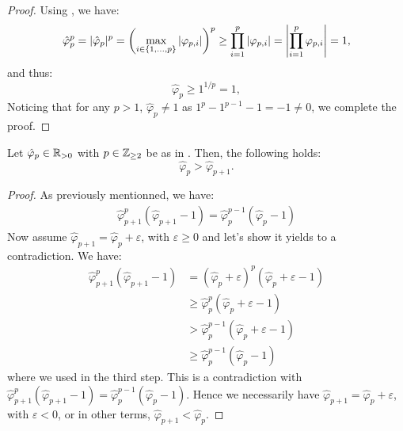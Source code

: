 \documentclass{article}
\begin{document}
    \begin{proof}
      Using , we have:
      \begin{equation} 
        \hat{\varphi}_p^p = |\hat{\varphi}_p|^p = \left(\max_{i \in \{1, \dots, p\}} |\varphi_{p, i}|\right)^p \geq \prod_{i=1}^p |\varphi_{p, i}| 
        = \left|\prod_{i=1}^p \varphi_{p, i}\right| = 1,
      \end{equation}
      and thus:
      \begin{equation} 
        \hat{\varphi}_p \geq 1^{1/p} = 1,
      \end{equation}
      Noticing that for any $p > 1$, $\hat{\varphi}_p \neq 1$ as $1^p - 1^{p-1} -1 = -1 \neq 0$, we complete the proof.
    \end{proof}

    \begin{theorem} \label{thm:A-11}
      Let $\hat{\varphi}_{p} \in \mathbb{R}_{>0}$ with $p \in \mathbb{Z}_{\geq 2}$ be as in . Then, the following holds:
      \begin{equation} 
        \hat{\varphi}_p > \hat{\varphi}_{p+1}.
      \end{equation}
    \end{theorem}
    
    \begin{proof}
      As previously mentionned, we have:
      \begin{align}
        \hat{\varphi}_{p+1}^{p}(\hat{\varphi}_{p+1} - 1) = \hat{\varphi}_{p}^{p-1}(\hat{\varphi}_{p} - 1) 
      \end{align}
      Now assume $\hat{\varphi}_{p+1} = \hat{\varphi}_{p} + \varepsilon$, with $\varepsilon \geq 0$ and let's show it yields to 
      a contradiction. We have:
      \begin{align} 
        \hat{\varphi}_{p+1}^{p}(\hat{\varphi}_{p+1} - 1) 
        & = (\hat{\varphi}_{p} + \varepsilon)^{p}(\hat{\varphi}_{p} + \varepsilon - 1) \\
        & \geq \hat{\varphi}_{p}^{p}(\hat{\varphi}_{p} + \varepsilon - 1) \\
        & > \hat{\varphi}_{p}^{p-1}(\hat{\varphi}_{p} + \varepsilon - 1) \\
        & \geq \hat{\varphi}_{p}^{p-1}(\hat{\varphi}_{p} - 1)
      \end{align}
      where we used  in the third step. This is a contradiction with $\hat{\varphi}_{p+1}^{p}(\hat{\varphi}_{p+1} - 1) 
      = \hat{\varphi}_{p}^{p-1}(\hat{\varphi}_{p} - 1)$. Hence we necessarily have $\hat{\varphi}_{p+1} = \hat{\varphi}_{p} + \varepsilon$,
      with $\varepsilon < 0$, or in other terms, $\hat{\varphi}_{p+1} < \hat{\varphi}_{p}$.
    \end{proof}
\end{document}
